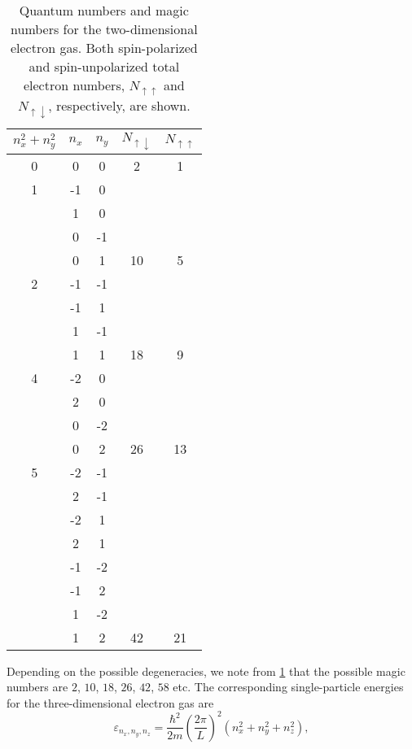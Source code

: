 \documentclass[aps,twocolumn,showpacs,floatfix,nofootinbib,preprintnumbers,superscriptaddress,amsmath,amssymb]{revtex4-1}
\begin{document}
\begin{table}
\caption{Quantum numbers and magic numbers for the two-dimensional electron gas. Both spin-polarized and 
spin-unpolarized total electron numbers, $N_{\uparrow \uparrow }$ and $N_{\uparrow \downarrow }$, respectively, are shown. \label{tab:2dimspbasis}}
        \begin{tabular}{c|c|c|c|c}
          $n_{x}^{2}+n_{y}^{2}$ & $n_{x}$ & $n_{y}$ & $N_{\uparrow \downarrow }$ & $N_{\uparrow \uparrow }$ \\
          \hline
           0 & 0 & 0 & 2 & 1 \\
           \hline
           1 & -1 &  0 & & \\
             &  1 &  0 & & \\
             &  0 & -1 & & \\
             &  0 &  1 & 10 & 5 \\
          \hline
          2  & -1 & -1 & & \\
             & -1 &  1 & & \\
             &  1 & -1 & & \\
             &  1 &  1 & 18 & 9 \\
          \hline
          4  & -2 & 0 & & \\
             &  2 & 0 & & \\
             &  0 & -2 & & \\
             &  0 &  2 & 26 & 13 \\
          \hline
          5  & -2 & -1 & & \\
             &  2 & -1 & & \\
             & -2 &  1 & & \\
             &  2 &  1 & & \\
             & -1 & -2 & & \\
             & -1 &  2 & & \\
             &  1 & -2 & & \\
             &  1 &  2 & 42 & 21 \\
          \hline
        \end{tabular}
\end{table}   
Depending on the possible degeneracies, we note from \ref{tab:2dimspbasis} that the possible magic numbers are $2$, $10$, $18$, $26$, $42$, $58$ etc. The corresponding 
single-particle energies for the three-dimensional electron gas are 
\[    
\varepsilon_{n_{x}, n_{y}, n_{z}} = \frac{\hbar^{2}}{2m}\left( \frac{2\pi }{L}\right)^{2}(n_{x}^{2}+n_{y}^{2}+n_{z}^{2}),
\]
\end{document}
